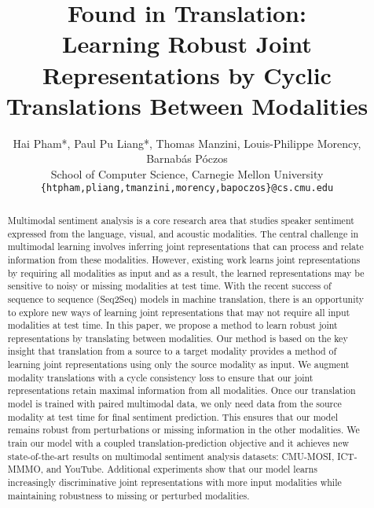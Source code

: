\documentclass[letterpaper]{article} %
\begin{document}
\title{Found in Translation: \\ Learning Robust Joint Representations by Cyclic Translations Between Modalities}

\author{Hai Pham*, Paul Pu Liang*, Thomas Manzini, Louis-Philippe Morency, Barnab\'{a}s P\'{o}czos \\
School of Computer Science, Carnegie Mellon University \\
\texttt {\{htpham,pliang,tmanzini,morency,bapoczos\}@cs.cmu.edu}
}

\maketitle

\begin{abstract}
Multimodal sentiment analysis is a core research area that studies speaker sentiment expressed from the language, visual, and acoustic modalities. The central challenge in multimodal learning involves inferring joint representations that can process and relate information from these modalities. However, existing work learns joint representations by requiring all modalities as input and as a result, the learned representations may be sensitive to noisy or missing modalities at test time. With the recent success of sequence to sequence (Seq2Seq) models in machine translation, there is an opportunity to explore new ways of learning joint representations that may not require all input modalities at test time. In this paper, we propose a method to learn robust joint representations by translating between modalities. Our method is based on the key insight that translation from a source to a target modality provides a method of learning joint representations using only the source modality as input. We augment modality translations with a cycle consistency loss to ensure that our joint representations retain maximal information from all modalities. Once our translation model is trained with paired multimodal data, we only need data from the source modality at test time for final sentiment prediction. This ensures that our model remains robust from perturbations or missing information in the other modalities. We train our model with a coupled translation-prediction objective and it achieves new state-of-the-art results on multimodal sentiment analysis datasets: CMU-MOSI, ICT-MMMO, and YouTube. Additional experiments show that our model learns increasingly discriminative joint representations with more input modalities while maintaining robustness to missing or perturbed modalities.
\end{abstract}
\end{document}
